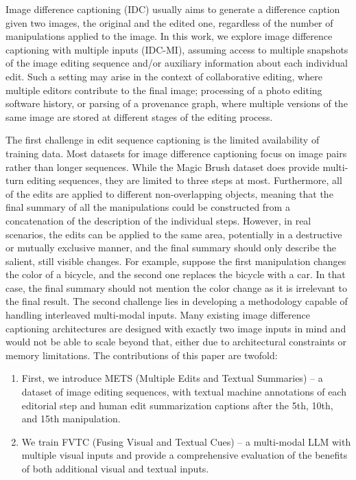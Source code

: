 \documentclass[10pt,twocolumn,letterpaper]{article}
\begin{document}
Image difference captioning (IDC) usually aims to generate a difference caption given two images, 
the original and the edited one, regardless of the number of manipulations applied to the image.
In this work, we explore image difference captioning with multiple inputs (IDC-MI),
assuming access to multiple snapshots of the image editing sequence and/or auxiliary information about each individual edit.
Such a setting may arise in the context of collaborative editing, where multiple editors contribute to the final image;
processing of a photo editing software history, or parsing of a provenance graph, where multiple versions of the same image are stored at different stages of the editing process.

The first challenge in edit sequence captioning is the limited availability of training data. Most datasets for image difference captioning focus on image pairs rather than longer sequences. While the Magic Brush \cite{magicbrush} dataset does provide multi-turn editing sequences, they are limited to three steps at most. Furthermore, all of the edits are applied to different non-overlapping objects, meaning that the final summary of all the manipulations could be constructed from a concatenation of the description of the individual steps. However, in real scenarios, the edits can be applied to the same area, potentially in a destructive or mutually exclusive manner, and the final summary should only describe the salient, still visible changes. For example, suppose the first manipulation changes the color of a bicycle, and the second one replaces the bicycle with a car. In that case, the final summary should not mention the color change as it is irrelevant to the final result. The second challenge lies in developing a methodology capable of handling interleaved multi-modal inputs. Many existing image difference captioning architectures are designed with exactly two image inputs in mind and would not be able to scale beyond that, either due to architectural constraints or memory limitations. The contributions of this paper are twofold:
\begin{enumerate}
    \item First, we introduce METS (Multiple Edits and Textual Summaries) -- a dataset of image editing sequences, with textual machine annotations of each editorial step and human edit summarization captions after the 5th, 10th, and 15th manipulation.
    \item We train FVTC (Fusing Visual and Textual Cues) -- a multi-modal LLM with multiple visual inputs and provide a comprehensive evaluation of the benefits of both additional visual and textual inputs. 
\end{enumerate}
\end{document}
